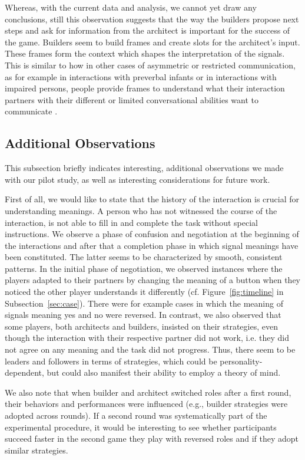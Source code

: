 Whereas, with the current data and analysis, we cannot yet draw any conclusions, still this observation suggests that the way the builders propose next steps and ask for information from the architect is important for the success of the game. Builders seem to build frames and create slots for the architect's input. These frames form the context which shapes the interpretation of the signals. This is similar to how in other cases of asymmetric or restricted communication, as for example in interactions with preverbal infants or in interactions with impaired persons, people provide frames to understand what their interaction partners with their different or limited conversational abilities want to communicate \cite{ochs1979propositions, goodwin1995co}.

\subsection{Additional Observations}
This subsection briefly indicates interesting, additional observations we made with our pilot study, as well as interesting considerations for future work.

First of all, we would like to state that the history of the interaction is crucial for understanding meanings. A person who has not witnessed the course of the interaction, is not able to fill in and complete the task without special instructions. We observe a phase of confusion and negotiation at the beginning of the interactions and after that a completion phase in which signal meanings have been constituted. The latter seems to be characterized by smooth, consistent patterns. In the initial phase of negotiation, we observed instances where the players adapted to their partners by changing the meaning of a button when they noticed the other player understands it differently (cf. Figure~\ref{fig:timeline} in Subsection~\ref{sec:case}). There were for example cases in which the meaning of signals meaning yes and no were reversed.
In contrast, we also observed that some players, both architects and builders, insisted on their strategies, even though the interaction with their respective partner did not work, i.e. they did not agree on any meaning and the task did not progress. Thus, there seem to be leaders and followers in terms of strategies, which could be personality-dependent, but could also manifest their ability to employ a theory of mind.

We also note that when builder and architect switched roles after a first round, their behaviors and performances were influenced (e.g., builder strategies were adopted across rounds). If a second round was systematically part of the experimental procedure, it would be interesting to see whether participants succeed faster in the second game they play with reversed roles and if they adopt similar strategies.

